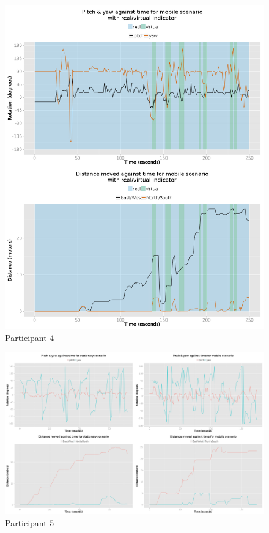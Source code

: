 \begin{figure}[h]
	\begin{center}
		\includegraphics[width=\linewidth]{images/25072014_1500_2up.png}
		\caption{Participant 4}
		\label{participant_4_2up}
	\end{center}
\end{figure}


	\begin{figure}[h]
		\begin{center}
			\includegraphics[width=\linewidth]{images/29082014_1350_4up.png}
			\caption{Participant 5}
			\label{participant_5_4up}
		\end{center}
	\end{figure}

